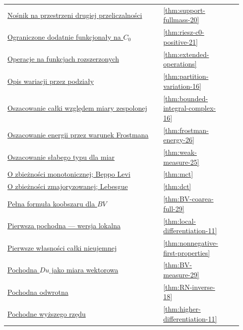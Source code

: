 \documentclass[11pt,a4paper,oneside]{book}
\numberwithin{equation}{chapter}
\theoremstyle{plain}
\theoremstyle{definition}
\theoremstyle{remark}
\begin{document}
\begin{longtable}{@{}p{0.72\linewidth}p{0.135\linewidth}p{0.08\linewidth}@{}}
\hyperref[thm:support-fullmass-20]{Nośnik na przestrzeni drugiej przeliczalności} & \ref*{thm:support-fullmass-20} & \pageref*{thm:support-fullmass-20} \\
\hyperref[thm:riesz-c0-positive-21]{Ograniczone dodatnie funkcjonały na $C_0$} & \ref*{thm:riesz-c0-positive-21} & \pageref*{thm:riesz-c0-positive-21} \\
\hyperref[thm:extended-operations]{Operacje na funkcjach rozszerzonych} & \ref*{thm:extended-operations} & \pageref*{thm:extended-operations} \\
\hyperref[thm:partition-variation-16]{Opis wariacji przez podziały} & \ref*{thm:partition-variation-16} & \pageref*{thm:partition-variation-16} \\
\hyperref[thm:bounded-integral-complex-16]{Oszacowanie całki względem miary zespolonej} & \ref*{thm:bounded-integral-complex-16} & \pageref*{thm:bounded-integral-complex-16} \\
\hyperref[thm:frostman-energy-26]{Oszacowanie energii przez warunek Frostmana} & \ref*{thm:frostman-energy-26} & \pageref*{thm:frostman-energy-26} \\
\hyperref[thm:weak-measure-25]{Oszacowanie słabego typu dla miar} & \ref*{thm:weak-measure-25} & \pageref*{thm:weak-measure-25} \\
\hyperref[thm:mct]{O zbieżności monotonicznej; Beppo Levi} & \ref*{thm:mct} & \pageref*{thm:mct} \\
\hyperref[thm:dct]{O zbieżności zmajoryzowanej; Lebesgue} & \ref*{thm:dct} & \pageref*{thm:dct} \\
\hyperref[thm:BV-coarea-full-29]{Pełna formuła koobszaru dla $BV$} & \ref*{thm:BV-coarea-full-29} & \pageref*{thm:BV-coarea-full-29} \\
\hyperref[thm:local-differentiation-11]{Pierwsza pochodna — wersja lokalna} & \ref*{thm:local-differentiation-11} & \pageref*{thm:local-differentiation-11} \\
\hyperref[thm:nonnegative-first-properties]{Pierwsze własności całki nieujemnej} & \ref*{thm:nonnegative-first-properties} & \pageref*{thm:nonnegative-first-properties} \\
\hyperref[thm:BV-measure-29]{Pochodna $Du$ jako miara wektorowa} & \ref*{thm:BV-measure-29} & \pageref*{thm:BV-measure-29} \\
\hyperref[thm:RN-inverse-18]{Pochodna odwrotna} & \ref*{thm:RN-inverse-18} & \pageref*{thm:RN-inverse-18} \\
\hyperref[thm:higher-differentiation-11]{Pochodne wyższego rzędu} & \ref*{thm:higher-differentiation-11} & \pageref*{thm:higher-differentiation-11} \\

\end{longtable}
\end{document}
